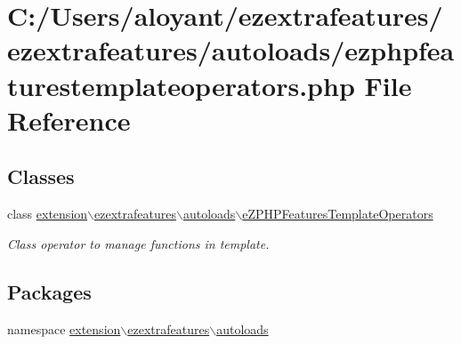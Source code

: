 \hypertarget{ezphpfeaturestemplateoperators_8php}{\section{C\-:/\-Users/aloyant/ezextrafeatures/ezextrafeatures/autoloads/ezphpfeaturestemplateoperators.php File Reference}
\label{ezphpfeaturestemplateoperators_8php}
}
\subsection*{Classes}
\begin{DoxyCompactItemize}
\item 
class \hyperlink{classextension_1_1ezextrafeatures_1_1autoloads_1_1e_z_p_h_p_features_template_operators}{extension$\backslash$ezextrafeatures$\backslash$autoloads$\backslash$e\-Z\-P\-H\-P\-Features\-Template\-Operators}
\begin{DoxyCompactList}\small\item\em Class operator to manage functions in template. \end{DoxyCompactList}\end{DoxyCompactItemize}
\subsection*{Packages}
\begin{DoxyCompactItemize}
\item 
namespace \hyperlink{namespaceextension_1_1ezextrafeatures_1_1autoloads}{extension$\backslash$ezextrafeatures$\backslash$autoloads}
\end{DoxyCompactItemize}
